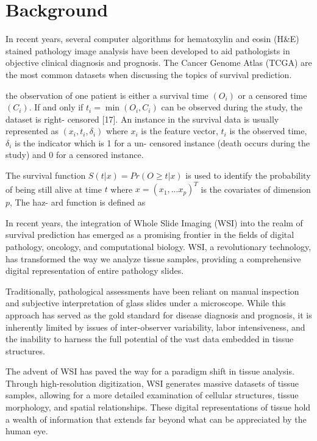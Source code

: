 \documentclass[journal,twoside,web]{ieeecolor}
\begin{document}
\section{Background}
In recent years, several computer algorithms for hematoxylin and eosin (H\&E) stained pathology image analysis have been developed to aid pathologists in objective clinical diagnosis and prognosis.
The Cancer Genome Atlas (TCGA) are the most common datasets when discussing the topics of survival prediction.

the observation of one patient is either a survival time $(O_i)$ or a censored time $(C_i).$ If and only if $t_i=\min(O_i,C_i)$ can be observed during the study, the dataset is right- censored [17]. An instance in the survival data is usually represented as $(x_i,t_i,\delta_i)$ where $x_i$ is the feature vector, $t_i$ is the observed time, $\delta_i$ is the indicator which is 1 for a un- censored instance (death occurs during the study) and 0 for a censored instance.

The survival function $S(t|x)=Pr(O\geq t|x)$ is used to identify the probability of being still alive at time $t$ where $x=(x_1,...x_p)^T$ is the covariates of dimension $p$, The haz- ard function is defined as

In recent years, the integration of Whole Slide Imaging (WSI) into the realm of survival prediction has emerged as a promising frontier in the fields of digital pathology, oncology, and computational biology. WSI, a revolutionary technology, has transformed the way we analyze tissue samples, providing a comprehensive digital representation of entire pathology slides.

Traditionally, pathological assessments have been reliant on manual inspection and subjective interpretation of glass slides under a microscope. While this approach has served as the gold standard for disease diagnosis and prognosis, it is inherently limited by issues of inter-observer variability, labor intensiveness, and the inability to harness the full potential of the vast data embedded in tissue structures.

The advent of WSI has paved the way for a paradigm shift in tissue analysis. Through high-resolution digitization, WSI generates massive datasets of tissue samples, allowing for a more detailed examination of cellular structures, tissue morphology, and spatial relationships. These digital representations of tissue hold a wealth of information that extends far beyond what can be appreciated by the human eye.
\end{document}
